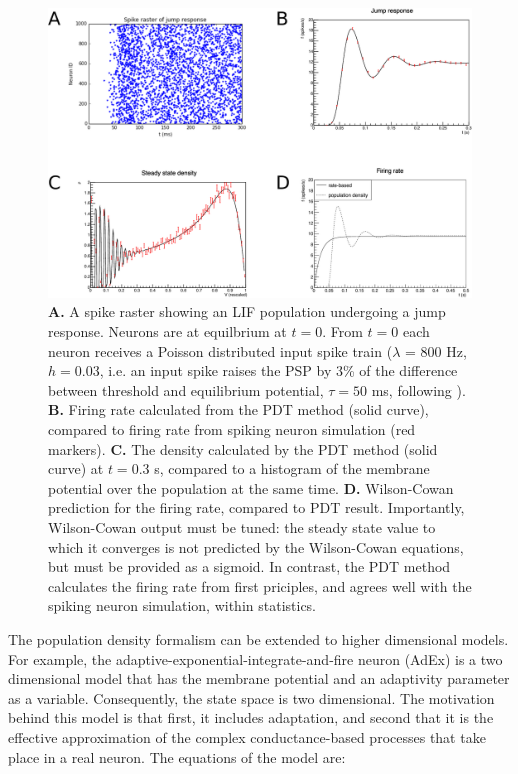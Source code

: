 \documentclass[10pt]{article}
\begin{document}
\begin{figure}[h!]
  \begin{center}
    \includegraphics[width=1.0\columnwidth]{figures/pdt_overview.pdf}

    \caption{\textbf{A.} A spike raster showing an LIF population undergoing a jump response.
        Neurons are at equilbrium at $t = 0$. From $t=0$ each neuron receives a Poisson distributed input spike train ($\lambda$ = 800 Hz, $h= 0.03$, i.e. an input spike raises the PSP by 3\% of the difference between threshold and equilibrium potential, $\tau = 50$ ms, following \cite{omurtag2000simulation}).
        \textbf{B.} Firing rate calculated from the PDT method (solid curve), compared to firing rate from spiking neuron simulation (red markers).
        \textbf{C.} The density calculated by the PDT method (solid curve) at $t=0.3$ s, compared to a histogram of the membrane potential over the population at the
        same time.
        \textbf{D.} Wilson-Cowan prediction for the firing rate, compared to PDT result. Importantly, Wilson-Cowan output must be tuned: the steady state value to which it converges is not predicted by the Wilson-Cowan equations, but must be provided as a sigmoid. 
       In contrast, the PDT method calculates the firing rate from first priciples, and agrees well with the spiking neuron simulation, within statistics.
      }
\label{fig:pdt-case}
  \end{center}
\end{figure}


The population density formalism can be extended to higher dimensional models.
For example, the adaptive-exponential-integrate-and-fire neuron (AdEx) \cite{brette2005adaptive} is a two dimensional model that has the membrane potential and an adaptivity parameter as a variable.
Consequently, the state space is two dimensional.
The motivation behind this model is that first, it includes adaptation, and second that it is the effective approximation of the complex conductance-based processes that take place in a real neuron.
The equations of the model are:
\end{document}
